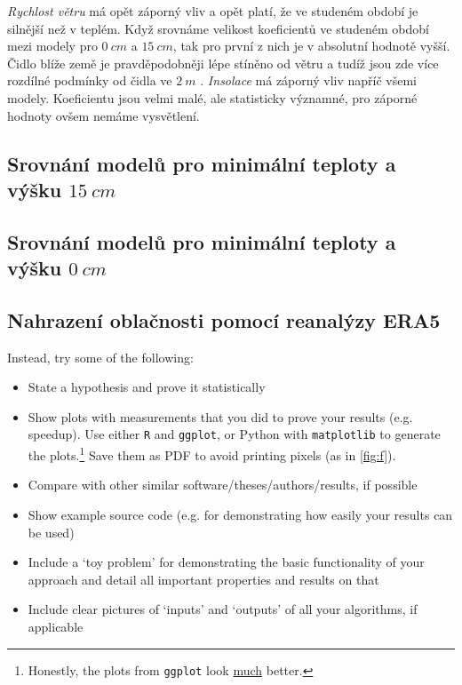\textit{Rychlost větru} má opět záporný vliv a opět platí, že ve studeném období je silnější než v teplém. Když srovnáme velikost koeficientů ve studeném období mezi modely pro $\SI{0}{cm}$ a $\SI{15}{cm}$, tak pro první z nich je v absolutní hodnotě vyšší. Čidlo blíže země je pravděpodobněji lépe stíněno od větru a tudíž jsou zde více rozdílné podmínky od čidla ve $\SI{2}{m}$ \parencite{wind_contrastingmicroclimates}. \textit{Insolace} má záporný vliv napříč všemi modely. Koeficientu jsou velmi malé, ale statisticky významné, pro záporné hodnoty ovšem nemáme vysvětlení.

\subsection{Srovnání modelů pro minimální teploty a výšku $\SI{15}{cm}$}

\subsection{Srovnání modelů pro minimální teploty a výšku $\SI{0}{cm}$}

\subsection{Nahrazení oblačnosti pomocí reanalýzy ERA5}

Instead, try some of the following:
\begin{itemize}
\item State a hypothesis and prove it statistically
\item Show plots with measurements that you did to prove your results (e.g. speedup). Use either \texttt{R} and \texttt{ggplot}, or Python with \texttt{matplotlib} to generate the plots.\footnote{Honestly, the plots from \texttt{ggplot} look \underline{much} better.} Save them as PDF to avoid printing pixels (as in \cref{fig:f}).
\item Compare with other similar software/theses/authors/results, if possible
\item Show example source code (e.g. for demonstrating how easily your results can be used)
\item Include a `toy problem' for demonstrating the basic functionality of your approach and detail all important properties and results on that
\item Include clear pictures of `inputs' and `outputs' of all your algorithms, if applicable
\end{itemize}

